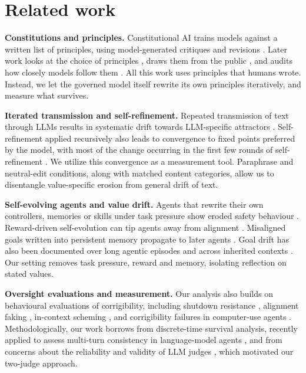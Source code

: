 \section{Related work}
\label{sec:related}

\textbf{Constitutions and principles.}
Constitutional AI trains models against a written list of principles, using model-generated critiques and revisions \citep{bai2022constitutional}. Later work looks at the choice of principles \citep{kundu2023specific}, draws them from the public \citep{huang2024collective}, and audits how closely models follow them \citep{jakkli2026constitutions}. All this work uses principles that humans wrote. Instead, we let the governed model itself rewrite its own principles iteratively, and measure what survives.

\textbf{Iterated transmission and self-refinement.}
Repeated transmission of text through LLMs results in systematic drift towards LLM-specific attractors \citep{perez2024telephone,mohamed2025broken,geng2026markovian}. Self-refinement applied recursively also leads to convergence to fixed points preferred by the model, with most of the change occurring in the first few rounds of self-refinement \citep{wu2026converge}. We utilize this convergence as a measurement tool. Paraphrase and neutral-edit conditions, along with matched content categories, allow us to disentangle value-specific erosion from general drift of text.

\textbf{Self-evolving agents and value drift.}
Agents that rewrite their own controllers, memories or skills under task pressure show eroded safety behaviour \citep{das2026seabench}. Reward-driven self-evolution can tip agents away from alignment \citep{han2025alignmenttipping}. Misaligned goals written into persistent memory propagate to later agents \citep{das2026selfpropagating}. Goal drift has also been documented over long agentic episodes \citep{arike2025goaldraft} and across inherited contexts \citep{menon2026inherited}. Our setting removes task pressure, reward and memory, isolating reflection on stated values.

\textbf{Oversight evaluations and measurement.}
Our analysis also builds on behavioural evaluations of corrigibility, including shutdown resistance \citep{schlatter2025shutdown}, alignment faking \citep{greenblatt2024alignmentfaking}, in-context scheming \citep{meinke2024scheming}, and corrigibility failures in computer-use agents \citep{tien2026rogue}. Methodologically, our work borrows from discrete-time survival analysis, recently applied to assess multi-turn consistency in language-model agents \citep{bogdanov2026survival}, and from concerns about the reliability and validity of LLM judges \citep{norman2026reliability,mukherjee2026geometry}, which motivated our two-judge approach.
